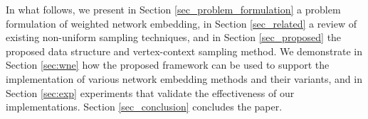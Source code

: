 In what follows, we present in Section \ref{sec_problem_formulation} a problem formulation of weighted network embedding, in Section \ref{sec_related} a review of existing non-uniform sampling techniques, and in Section \ref{sec_proposed} the proposed data structure and vertex-context sampling method.
We demonstrate in Section \ref{sec:wne} how the proposed framework can be used to support the implementation of various network embedding methods and their variants, and in Section \ref{sec:exp} experiments that validate the effectiveness of our implementations.
Section \ref{sec_conclusion} concludes the paper.





